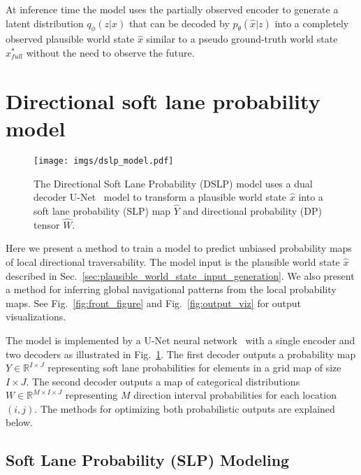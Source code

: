 \documentclass[letterpaper, 10 pt, conference]{ieeeconf}
\begin{document}
At inference time the model uses the partially observed encoder to generate a latent distribution $q_\phi(z|x)$ that can be decoded by $p_\theta(\hat{x}|z)$ into a completely observed plausible world state $\hat{x}$ similar to a pseudo ground-truth world state $x^\ast_{full}$ without the need to observe the future.





\section{Directional soft lane probability model}
\label{sec:dslp_model}

\begin{figure}\centering
\texttt{[image: imgs/dslp\_model.pdf]}
\vspace{-3mm}
\caption{The Directional Soft Lane Probability (DSLP) model uses a dual decoder U-Net~\cite{ronneberger2015unet} model to transform a plausible world state $\hat{x}$ into a soft lane probability (SLP) map $\hat{Y}$ and directional probability (DP) tensor $\hat{W}$.}
\label{fig:dslp_model}
\vspace{-5mm}
\end{figure}

Here we present a method to train a model to predict unbiased probability maps of local directional traversability. The model input is the plausible world state $\hat{x}$ described in Sec.~\ref{sec:plausible_world_state_input_generation}. We also present a method for inferring global navigational patterns from the local probability maps. See Fig.~\ref{fig:front_figure} and Fig.~\ref{fig:output_viz} for output visualizations.

The model is implemented by a U-Net neural network~\cite{ronneberger2015unet} with a single encoder and two decoders as illustrated in Fig.~\ref{fig:dslp_model}. The first decoder outputs a probability map $Y \in \mathbb{R}^{I \times J}$ representing soft lane probabilities for elements in a grid map of size $I \times J$. The second decoder outputs a map of categorical distributions $W \in \mathbb{R}^{M \times I \times J}$ representing $M$ direction interval probabilities for each location $(i,j)$. The methods for optimizing both probabilistic outputs are explained below.

\subsection{Soft Lane Probability (SLP) Modeling}
\end{document}
